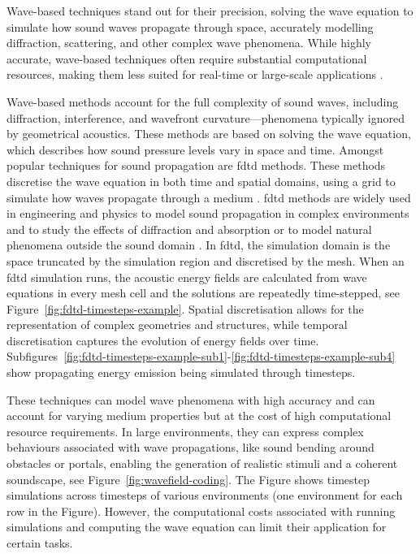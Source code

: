 Wave-based techniques stand out for their precision, solving the wave equation to simulate how sound waves propagate through space, accurately modelling diffraction, scattering, and other complex wave phenomena. While highly accurate, wave-based techniques often require substantial computational resources, making them less suited for real-time or large-scale applications \citep{raghuvanshi2014parametric}.\par
Wave-based methods account for the full complexity of sound waves, including diffraction, interference, and wavefront curvature—phenomena typically ignored by geometrical acoustics. These methods are based on solving the wave equation, which describes how sound pressure levels vary in space and time.
Amongst popular techniques for sound propagation are \acrfull{fdtd} methods. These methods discretise the wave equation in both time and spatial domains, using a grid to simulate how waves propagate through a medium \citep{hamilton2017fdtd}. \acrshort{fdtd} methods are widely used in engineering and physics to model sound propagation in complex environments and to study the effects of diffraction and absorption or to model natural phenomena outside the sound domain \citep{teixeira2023finite}.
In \acrshort{fdtd}, the simulation domain is the space truncated by the simulation region and discretised by the mesh. When an \acrshort{fdtd} simulation runs, the acoustic energy fields are calculated from wave equations in every mesh cell and the solutions are repeatedly time-stepped, see Figure~\ref{fig:fdtd-timesteps-example}. Spatial discretisation allows for the representation of complex geometries and structures, while temporal discretisation captures the evolution of energy fields over time. Subfigures~\ref{fig:fdtd-timesteps-example-sub1}-\ref{fig:fdtd-timesteps-example-sub4} show propagating energy emission being simulated through timesteps.\par
These techniques can model wave phenomena with high accuracy and can account for varying medium properties but at the cost of high computational resource requirements. In large environments, they can express complex behaviours associated with wave propagations, like sound bending around obstacles or portals, enabling the generation of realistic stimuli and a coherent soundscape, see Figure~\ref{fig:wavefield-coding}. The Figure shows timestep simulations across timesteps of various environments (one environment for each row in the Figure). However, the computational costs associated with running simulations and computing the wave equation can limit their application for certain tasks.
